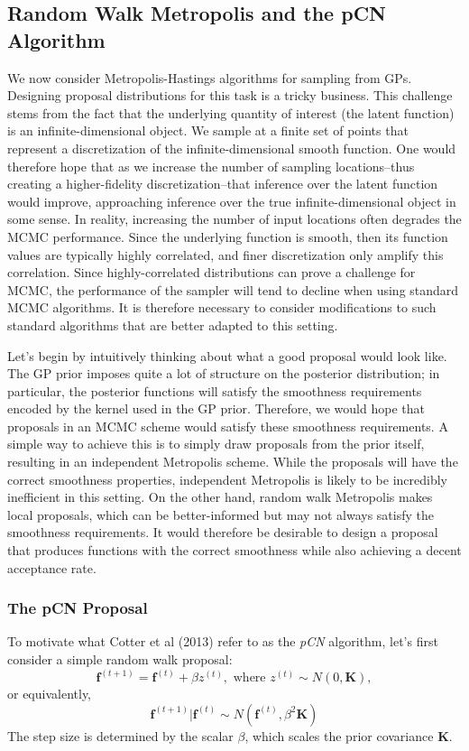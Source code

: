\documentclass[12pt]{article}
\begin{document}
\subsection{Random Walk Metropolis and the pCN Algorithm}
We now consider Metropolis-Hastings algorithms for sampling from GPs. Designing proposal distributions for this task is a tricky business. This challenge stems from the 
fact that the underlying quantity of interest (the latent function) is an infinite-dimensional object. We sample at a finite set of points that represent a discretization of the infinite-dimensional smooth function. One would therefore hope that as we increase the number of sampling locations--thus creating a higher-fidelity discretization--that inference over the latent function would improve, approaching inference over the true infinite-dimensional object in some sense. In reality, increasing the number of input locations often degrades the MCMC performance. Since the underlying function is smooth, then its function values are typically highly correlated, and finer discretization only amplify this correlation. Since highly-correlated distributions can prove a challenge for MCMC, the performance of the sampler will tend to decline when using standard MCMC algorithms. It is therefore necessary to consider modifications to such standard algorithms that are better adapted to this setting. 

Let's begin by intuitively thinking about what a good proposal would look like. The GP prior imposes quite a lot of structure on the posterior distribution; in particular, the posterior functions will satisfy the smoothness requirements encoded by the kernel used in the GP prior. Therefore, we would hope that proposals in an MCMC scheme would satisfy these smoothness requirements. A simple way to achieve this is to simply draw proposals from the prior itself, resulting in an independent Metropolis scheme. While the proposals will have the correct smoothness properties, independent Metropolis is likely to be incredibly inefficient in this setting. On the other hand, random walk Metropolis makes local proposals, which can be better-informed but may not always satisfy the smoothness requirements. It would therefore be desirable to design a proposal that produces functions with the correct smoothness while also achieving a decent acceptance rate. 

\subsubsection{The pCN Proposal}
To motivate what Cotter et al (2013) refer to as the \textit{pCN} algorithm, let's first consider a simple random walk proposal: 
\[\mathbf{f}^{(t + 1)} = \mathbf{f}^{(t)} + \beta z^{(t)}, \text{ where } z^{(t)} \sim N(0, \mathbf{K}),\]
or equivalently, 
\[\mathbf{f}^{(t + 1)}|\mathbf{f}^{(t)} \sim N(\mathbf{f}^{(t)}, \beta^2 \mathbf{K}) \]
The step size is determined by the scalar $\beta$, which scales the prior covariance $\mathbf{K}$. 
\end{document}
